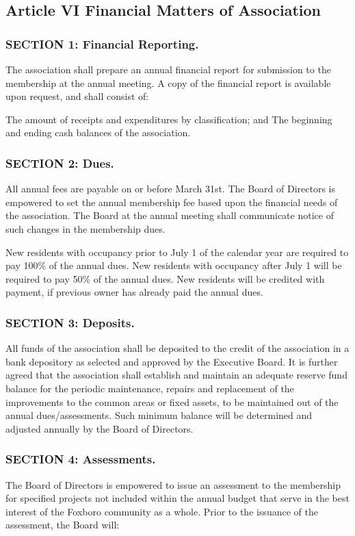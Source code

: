 \subsection{Article VI Financial Matters of Association}

\subsubsection{SECTION 1: Financial Reporting.}
The association shall prepare an annual financial report for submission
to the membership at the annual meeting. A copy of the financial report
is available upon request, and shall consist of:

The amount of receipts and expenditures by classification; and
The beginning and ending cash balances of the association.

\subsubsection{SECTION 2: Dues.}

All annual fees are payable on or before March 31st.  The Board of
Directors is empowered to set the annual membership fee based upon the
financial needs of the association. The Board at the annual meeting
shall communicate notice of such changes in the membership dues.

New residents with occupancy prior to July 1 of the calendar year are
required to pay 100\% of the annual dues. New residents with occupancy
after July 1 will be required to pay 50\% of the annual dues. New
residents will be credited with payment, if previous owner has already
paid the annual dues.



\subsubsection{SECTION 3: Deposits.}

All funds of the association shall be deposited to the credit of the
association in a bank depository as selected and approved by the Executive
Board. It is further agreed that the association shall establish and
maintain an adequate reserve fund balance for the periodic maintenance,
repairs and replacement of the improvements to the common areas or
fixed assets, to be maintained out of the annual dues/assessments. Such
minimum balance will be determined and adjusted annually by the Board
of Directors.

\subsubsection{SECTION 4: Assessments.}
The Board of Directors is empowered to issue an assessment to the
membership for specified projects not included within the annual budget
that serve in the best interest of the Foxboro community as a whole. Prior
to the issuance of the assessment, the Board will:

